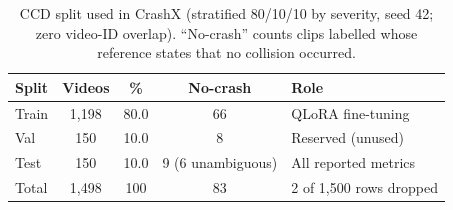 \begin{table}[!t]
\centering
\caption{CCD split used in CrashX (stratified 80/10/10 by severity, seed 42; zero video-ID overlap). ``No-crash'' counts clips labelled  whose reference states that no collision occurred.}
\label{tab:dataset}
\small
\begin{tabular}{@{}lcccl@{}}
\toprule
\textbf{Split} & \textbf{Videos} & \textbf{\%} & \textbf{No-crash} & \textbf{Role} \\
\midrule
Train & 1{,}198 & 80.0 & 66 & QLoRA fine-tuning \\
Val   & 150    & 10.0 & 8  & Reserved (unused) \\
Test  & 150    & 10.0 & 9 (6 unambiguous) & All reported metrics \\
\midrule
Total & 1{,}498 & 100 & 83 & 2 of 1{,}500 rows dropped \\
\bottomrule
\end{tabular}
\end{table}
